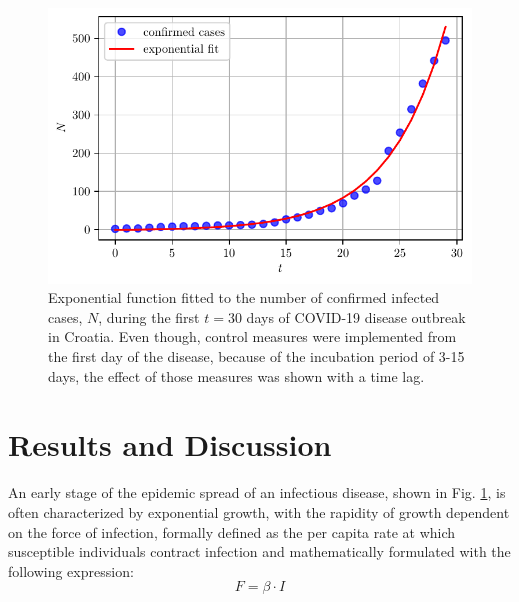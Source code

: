 \documentclass[conference]{IEEEtran}
\begin{document}
\begin{figure}[]
    \centering
    \includegraphics[width=\linewidth]{figs/early-stage-exp-fit.pdf}
    \caption{Exponential function fitted to the number of confirmed infected cases, $N$, during the first $t=30$ days of COVID-19 disease outbreak in Croatia. Even though, control measures were implemented from the first day of the disease, because of the incubation period of 3-15 days, the effect of those measures was shown with a time lag.}
    \label{fig.early_exp}
\end{figure}

\section{Results and Discussion}
\label{sec.results}
An early stage of the epidemic spread of an infectious disease, shown in Fig. \ref{fig.early_exp}, is often characterized by exponential growth, with the rapidity of growth dependent on the force of infection, formally defined as the per capita rate at which susceptible individuals contract infection and mathematically formulated with the following expression:
\begin{equation}
\label{eqn.force}
    F = \beta \cdot I
\end{equation}
\end{document}
